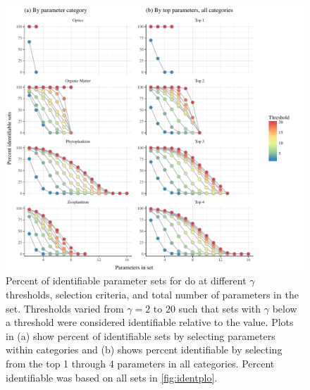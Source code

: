 \documentclass[letterpaper,12pt,oneside]{article}\usepackage[]{graphicx}\usepackage[]{color}
\makeatletter
\def\maxwidth{ %
  \ifdim\Gin@nat@width>\linewidth
    \linewidth
  \else
    \Gin@nat@width
  \fi
}
\makeatother
\begin{document}
\begin{figure}[!ht]

{\centering \includegraphics[width=\maxwidth]{figs/percthresh-1} 

}

\caption{Percent of identifiable parameter sets for \ac{do} at different $\gamma$ thresholds, selection criteria, and total number of parameters in the set.  Thresholds varied from $\gamma = 2$ to $20$ such that sets with $\gamma$ below a threshold were considered identifiable relative to the value. Plots in (a) show percent of identifiable sets by selecting parameters within categories and (b) shows percent identifiable by selecting from the top 1 through 4 parameters in all categories.  Percent identifiable was based on all sets in \cref{fig:identplo}.}\label{fig:percthresh}
\end{figure}
\end{document}
